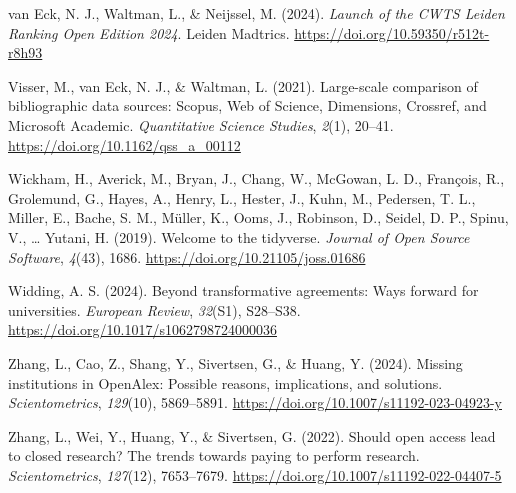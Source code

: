 \documentclass[a4paper,man,floatsintext,longtable,noextraspace,10pt]{apa6}
\newlength{\cslhangindent}
\newenvironment{CSLReferences}[2] %
{\begin{list}{}{%
  \setlength{\itemindent}{0pt}
  \setlength{\leftmargin}{0pt}
  \setlength{\parsep}{0pt}
  \ifodd #1
  \setlength{\leftmargin}{\cslhangindent}
  \setlength{\itemindent}{-1\cslhangindent}
  \fi
  \setlength{\itemsep}{#2\baselineskip}}}
{\end{list}}
\begin{document}
\begin{CSLReferences}{1}{0}
van Eck, N. J., Waltman, L., \& Neijssel, M. (2024). \emph{{Launch of
the CWTS Leiden Ranking Open Edition 2024}}. Leiden Madtrics.
\url{https://doi.org/10.59350/r512t-r8h93}

Visser, M., van Eck, N. J., \& Waltman, L. (2021). Large-scale
comparison of bibliographic data sources: {Scopus, Web of Science,
Dimensions, Crossref, and Microsoft Academic}. \emph{Quantitative
Science Studies}, \emph{2}(1), 20--41.
\url{https://doi.org/10.1162/qss_a_00112}

Wickham, H., Averick, M., Bryan, J., Chang, W., McGowan, L. D.,
François, R., Grolemund, G., Hayes, A., Henry, L., Hester, J., Kuhn, M.,
Pedersen, T. L., Miller, E., Bache, S. M., Müller, K., Ooms, J.,
Robinson, D., Seidel, D. P., Spinu, V., \ldots{} Yutani, H. (2019).
Welcome to the {tidyverse}. \emph{Journal of Open Source Software},
\emph{4}(43), 1686. \url{https://doi.org/10.21105/joss.01686}

Widding, A. S. (2024). Beyond transformative agreements: Ways forward
for universities. \emph{European Review}, \emph{32}(S1), S28--S38.
\url{https://doi.org/10.1017/s1062798724000036}

Zhang, L., Cao, Z., Shang, Y., Sivertsen, G., \& Huang, Y. (2024).
Missing institutions in OpenAlex: Possible reasons, implications, and
solutions. \emph{Scientometrics}, \emph{129}(10), 5869--5891.
\url{https://doi.org/10.1007/s11192-023-04923-y}

Zhang, L., Wei, Y., Huang, Y., \& Sivertsen, G. (2022). Should open
access lead to closed research? The trends towards paying to perform
research. \emph{Scientometrics}, \emph{127}(12), 7653--7679.
\url{https://doi.org/10.1007/s11192-022-04407-5}

\end{CSLReferences}
\end{document}
